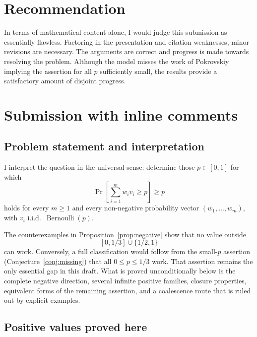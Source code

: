 \documentclass[12pt]{article}
\newcommand{\Ber}{\operatorname{Bernoulli}}
\begin{document}
\section{Recommendation}

  In terms of mathematical content alone, I would judge this submission as essentially flawless. Factoring in the presentation and citation weaknesses, minor revisions are necessary. The arguments are correct and progress is made towards resolving the problem. Although the model misses the work of Pokrovskiy implying the assertion for all $p$ sufficiently small, the results provide a satisfactory amount of disjoint progress.

  \section{Submission with inline comments}


\date{}

\subsection*{Problem statement and interpretation}

I interpret the question in the universal sense: determine those \(p\in[0,1]\)
for which
\[
        \Pr\!\left[\sum_{i=1}^m w_i v_i\ge p\right]\ge p                  \tag{P}
\]
holds for every \(m\ge1\) and every non-negative probability vector
\((w_1,\ldots,w_m)\), with \(v_i\) i.i.d.\ \(\Ber(p)\).

The counterexamples in Proposition~\ref{prop:negative} show that no value
outside
\[
        [0,1/3]\cup\{1/2,1\}
\]
can work.  Conversely, a full classification would follow from the
small-\(p\) assertion (Conjecture~\ref{conj:missing}) that all
\(0\le p\le1/3\) work.  That assertion remains the only essential gap in this
draft.  What is proved unconditionally below is the complete negative direction,
several infinite positive families, closure properties, equivalent forms of the
remaining assertion, and a coalescence route that is ruled out by explicit
examples.

\subsection*{Positive values proved here}
\end{document}
